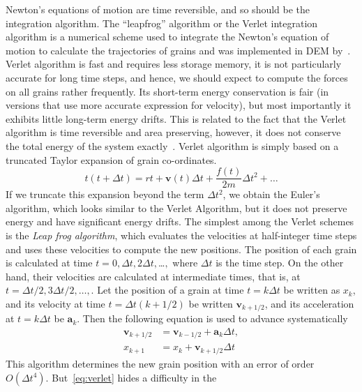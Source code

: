 Newton's equations of motion are time reversible, and so should be the 
integration algorithm. The ``leapfrog'' algorithm or the Verlet integration 
algorithm is a numerical scheme used to integrate the Newton's equation of 
motion to calculate the trajectories of grains and was implemented in 
DEM by~\citet{Verlet1967}. Verlet algorithm is 
fast and requires less storage memory, it is not particularly accurate for long 
time steps, and hence, we should expect to compute the forces on all grains 
rather frequently. Its short-term energy conservation is fair (in versions that 
use more accurate expression for velocity), but most importantly it exhibits 
little long-term energy drifts. This is related to the fact that the Verlet 
algorithm is time reversible and area preserving, however, it does not conserve 
the total energy of the system exactly~\citep{Frenkel1996}. Verlet algorithm is 
simply based on a truncated Taylor expansion of grain co-ordinates. 
%
\begin{equation}
t(t+\Delta t)=r{t} +\mathbf{v}(t) \Delta t + \frac{f(t)}{2\mathit{m}} \Delta 
t^{2}+ \dots
\end{equation}
%
If we truncate this expansion beyond the term $\Delta t^{2}$, we obtain the 
Euler's algorithm, which looks similar to the Verlet Algorithm, but it does not 
preserve energy and have significant energy drifts. The simplest among the 
Verlet schemes is the \textit{Leap frog algorithm}, which evaluates the 
velocities at half-integer time steps and uses these velocities to compute the 
new positions. The position of each grain is calculated at time $t=0, \Delta t, 
2\Delta t, $\dots$ ,$ where $\Delta t$ is the time step. On the other hand, 
their velocities are calculated at intermediate times, that is, at $t=\Delta 
t/2, 3 \Delta t/2, \dots,$. Let the position of a grain at time $t=k\Delta t$ 
be written as $x_{\mathit{k}}$, and its velocity at time $t=\Delta t (k + 
1/2)$ be written $\mathbf{v}_{\mathit{k + 1/2}}$, and its acceleration at $t=k 
\Delta t$ be $\mathbf{a}_{\mathit{k}}$. Then the following equation is used to 
advance systematically
%
\begin{align}\label{eq:verlet}
\mathbf{v}_{\mathit{k}+1/2} & 
=\mathbf{v}_{\mathit{k}-1/2}+\mathbf{a}_{\mathit{k}}
 \Delta t, \\
x_{\mathit{k}+1} & =x_{\mathit{k}}+\mathbf{v}_{\mathit{k}+1/2} \Delta t
\end{align}
%
This algorithm determines the new grain position with an error of order 
$\mathit{O}( \Delta t^{4})$. But~\cref{eq:verlet} hides a difficulty in the 

